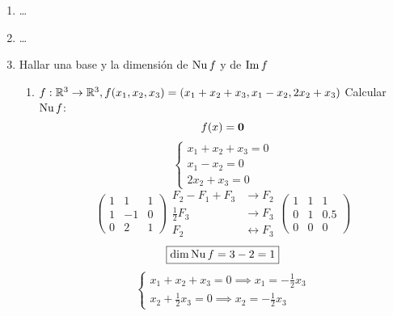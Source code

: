 \documentclass[../practica.root.tex]{subfiles}
\begin{document}
\begin{enumerate}
\begin{enumerate}
          \end{enumerate}
    \item \dots
    \item \dots
    \item Hallar una base y la dimensión de \(\operatorname{Nu} f\) y de \(\operatorname{Im} f\)
          \begin{enumerate}
              \item \( f : \mathbb{R}^3 \to \mathbb{R}^3, f(x_1,x_2,x_3) = (x_1 + x_2 + x_3, x_1 - x_2, 2x_2 + x_3) \)
                    Calcular \(\operatorname{Nu} f\):
                    \[ f(x) = \mathbf{0} \]
                    \[
                        \begin{cases}
                            x_1 + x_2 + x_3 = 0 \\
                            x_1 - x_2 = 0       \\
                            2x_2 + x_3 = 0
                        \end{cases}
                    \] \[
                        \begin{pmatrix}
                            1 & 1  & 1 \\
                            1 & -1 & 0 \\
                            0 & 2  & 1
                        \end{pmatrix}
                        \begin{array}{rl}
                            F_2 - F_1 + F_3 & \to F_2             \\
                            \frac{1}{2}F_3  & \to F_3             \\
                            F_2             & \leftrightarrow F_3
                        \end{array}
                        \begin{pmatrix}
                            1 & 1 & 1   \\
                            0 & 1 & 0.5 \\
                            0 & 0 & 0
                        \end{pmatrix}
                    \] \[
                        \boxed{\dim\operatorname{Nu}{f} = 3 - 2 = 1}
                    \] \[
                        \begin{cases}
                            x_1 + x_2 + x_3 = 0 \implies x_1 = -\frac{1}{2}x_3 \\
                            x_2 + \frac{1}{2}x_3 = 0 \implies x_2 = -\frac{1}{2}x_3
                        \end{cases}
\]
\end{enumerate}
\end{enumerate}
\end{document}
